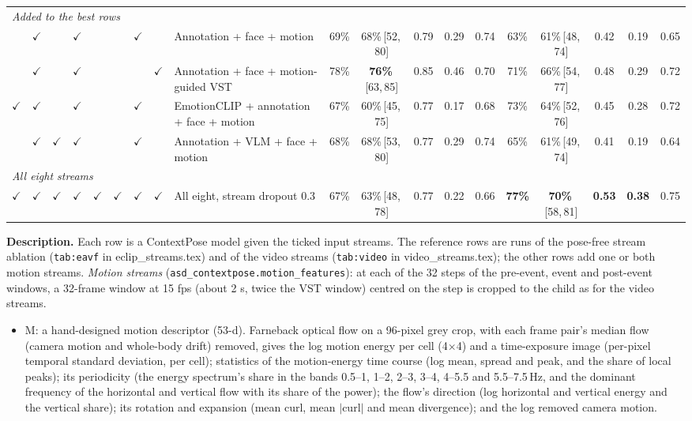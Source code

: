\documentclass[11pt]{article}
\newcommand{\code}[1]{\texttt{#1}}
\newcommand{\best}[1]{\textbf{#1}}
\newcommand{\ci}[2]{\,[#1,\,#2]}
\newcommand{\tabledesc}[1]{\par\medskip\begin{minipage}{\linewidth}\footnotesize\textbf{Description.} #1\end{minipage}}
\begin{document}
\begin{table}[!htbp]
{\begin{tabular}{cccccccclcccccccccc}
\midrule
\multicolumn{19}{l}{\emph{Added to the best rows}} \\
 & $\checkmark$ &  & $\checkmark$ &  &  & $\checkmark$ &  & Annotation + face + motion & 69\% & 68\%\ci{52}{80} & 0.79 & 0.29 & 0.74 & 63\% & 61\%\ci{48}{74} & 0.42 & 0.19 & 0.65 \\
 & $\checkmark$ &  & $\checkmark$ &  &  &  & $\checkmark$ & Annotation + face + motion-guided VST & 78\% & \best{76\%}\ci{63}{85} & 0.85 & 0.46 & 0.70 & 71\% & 66\%\ci{54}{77} & 0.48 & 0.29 & 0.72 \\
$\checkmark$ & $\checkmark$ &  & $\checkmark$ &  &  & $\checkmark$ &  & EmotionCLIP + annotation + face + motion & 67\% & 60\%\ci{45}{75} & 0.77 & 0.17 & 0.68 & 73\% & 64\%\ci{52}{76} & 0.45 & 0.28 & 0.72 \\
 & $\checkmark$ & $\checkmark$ & $\checkmark$ &  &  & $\checkmark$ &  & Annotation + VLM + face + motion & 68\% & 68\%\ci{53}{80} & 0.77 & 0.29 & 0.74 & 65\% & 61\%\ci{49}{74} & 0.41 & 0.19 & 0.64 \\
\midrule
\multicolumn{19}{l}{\emph{All eight streams}} \\
$\checkmark$ & $\checkmark$ & $\checkmark$ & $\checkmark$ & $\checkmark$ & $\checkmark$ & $\checkmark$ & $\checkmark$ & All eight, stream dropout 0.3 & 67\% & 63\%\ci{48}{78} & 0.77 & 0.22 & 0.66 & \best{77\%} & \best{70\%}\ci{58}{81} & \best{0.53} & \best{0.38} & 0.75 \\
\bottomrule
\end{tabular}%
}
\tabledesc{Each row is a ContextPose model given the ticked input streams. The reference rows are runs of the pose-free stream ablation (\code{tab:eavf} in eclip\_streams.tex) and of the video streams (\code{tab:video} in video\_streams.tex); the other rows add one or both motion streams.
\emph{Motion streams} (\code{asd\_contextpose.motion\_features}): at each of the 32 steps of the pre-event, event and post-event windows, a 32-frame window at 15 fps (about 2 s, twice the VST window) centred on the step is cropped to the child as for the video streams.
\begin{itemize}
  \item M: a hand-designed motion descriptor (53-d). Farneback optical flow on a 96-pixel grey crop, with each frame pair's median flow (camera motion and whole-body drift) removed, gives the log motion energy per cell (4$\times$4) and a time-exposure image (per-pixel temporal standard deviation, per cell); statistics of the motion-energy time course (log mean, spread and peak, and the share of local peaks); its periodicity (the energy spectrum's share in the bands 0.5--1, 1--2, 2--3, 3--4, 4--5.5 and 5.5--7.5\,Hz, and the dominant frequency of the horizontal and vertical flow with its share of the power); the flow's direction (log horizontal and vertical energy and the vertical share); its rotation and expansion (mean curl, mean $|$curl$|$ and mean divergence); and the log removed camera motion.

\end{itemize}}
\end{table}
\end{document}
